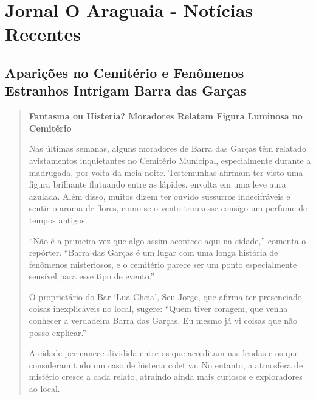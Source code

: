 \appendix
\chapter{Jornal O Araguaia - Notícias Recentes}

\section*{Aparições no Cemitério e Fenômenos Estranhos Intrigam Barra das Garças}

\begin{quote}
    \textbf{Fantasma ou Histeria? Moradores Relatam Figura Luminosa no Cemitério}

    Nas últimas semanas, alguns moradores de Barra das Garças têm relatado avistamentos inquietantes no Cemitério Municipal, especialmente durante a madrugada, por volta da meia-noite. Testemunhas afirmam ter visto uma figura brilhante flutuando entre as lápides, envolta em uma leve aura azulada. Além disso, muitos dizem ter ouvido sussurros indecifráveis e sentir o aroma de flores, como se o vento trouxesse consigo um perfume de tempos antigos.

    “Não é a primeira vez que algo assim acontece aqui na cidade,” comenta o repórter. “Barra das Garças é um lugar com uma longa história de fenômenos misteriosos, e o cemitério parece ser um ponto especialmente sensível para esse tipo de evento.”

    O proprietário do Bar ‘Lua Cheia’, Seu Jorge, que afirma ter presenciado coisas inexplicáveis no local, sugere: “Quem tiver coragem, que venha conhecer a verdadeira Barra das Garças. Eu mesmo já vi coisas que não posso explicar.”

    A cidade permanece dividida entre os que acreditam nas lendas e os que consideram tudo um caso de histeria coletiva. No entanto, a atmosfera de mistério cresce a cada relato, atraindo ainda mais curiosos e exploradores ao local.
\end{quote}


